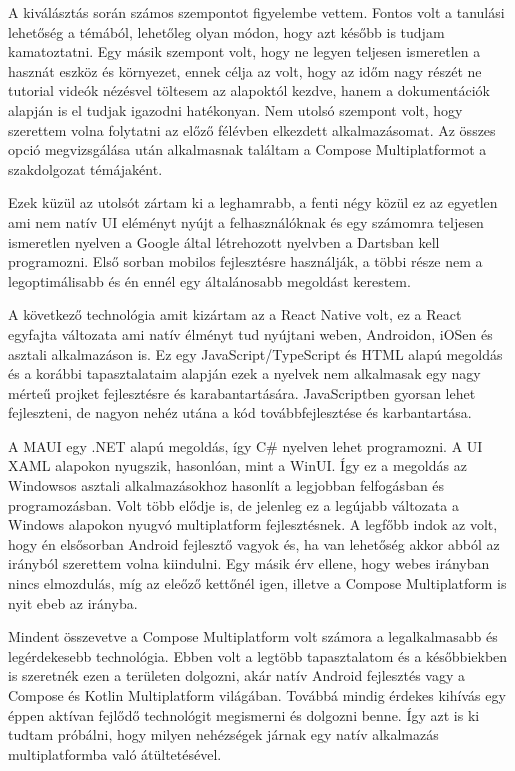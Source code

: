 A kiválásztás során számos szempontot figyelembe vettem. Fontos volt a tanulási lehetőség a témából, lehetőleg olyan módon, hogy azt később is tudjam kamatoztatni.
Egy másik szempont volt, hogy ne legyen teljesen ismeretlen a hasznát eszköz és környezet, ennek célja az volt, hogy az időm nagy részét ne tutorial videók nézésvel töltesem az alapoktól kezdve, hanem a dokumentációk alapján is el tudjak igazodni hatékonyan.
Nem utolsó szempont volt, hogy szerettem volna folytatni az előző félévben elkezdett alkalmazásomat.
Az összes opció megvizsgálása után alkalmasnak találtam a Compose Multiplatformot a szakdolgozat témájaként.

Ezek küzül az utolsót zártam ki a leghamrabb, a fenti négy közül ez az egyetlen ami nem natív UI eléményt nyújt a felhasználóknak és egy számomra teljesen ismeretlen nyelven a Google által létrehozott nyelvben a Dartsban kell programozni.
Első sorban mobilos fejlesztésre használják, a többi része nem a legoptimálisabb és én ennél egy általánosabb megoldást kerestem. \cite{Flutter}

A következő technológia amit kizártam az a React Native volt, ez a React egyfajta változata ami natív élményt tud nyújtani weben, Androidon, iOSen és asztali alkalmazáson is.
Ez egy JavaScript/TypeScript és HTML alapú megoldás és a korábbi tapasztalataim alapján ezek a nyelvek nem alkalmasak egy nagy mérteű projket fejlesztésre és karabantartására. 
JavaScriptben gyorsan lehet fejleszteni, de nagyon nehéz utána a kód továbbfejlesztése és karbantartása. \cite{ReactNative}

A MAUI egy .NET alapú megoldás, így C\# nyelven lehet programozni. A UI XAML alapokon nyugszik, hasonlóan, mint a WinUI.
Így ez a megoldás az Windowsos asztali alkalmazásokhoz hasonlít a legjobban felfogásban és programozásban.
Volt több elődje is, de jelenleg ez a legújabb változata a Windows alapokon nyugvó multiplatform fejlesztésnek.
A legfőbb indok az volt, hogy én elsősorban Android fejlesztő vagyok és, ha van lehetőség akkor abból az irányból szerettem volna kiindulni.
Egy másik érv ellene, hogy webes irányban nincs elmozdulás, míg az eleőző kettőnél igen, illetve a Compose Multiplatform is nyit ebeb az irányba. \cite{MAUI} 

Mindent összevetve a Compose Multiplatform volt számora a legalkalmasabb és legérdekesebb technológia.
Ebben volt a legtöbb tapasztalatom és a későbbiekben is szeretnék ezen a területen dolgozni, akár natív Android fejlesztés vagy a Compose és Kotlin Multiplatform világában.
Továbbá mindig érdekes kihívás egy éppen aktívan fejlődő technológit megismerni és dolgozni benne.
Így azt is ki tudtam próbálni, hogy milyen nehézségek járnak egy natív alkalmazás multiplatformba való átültetésével.